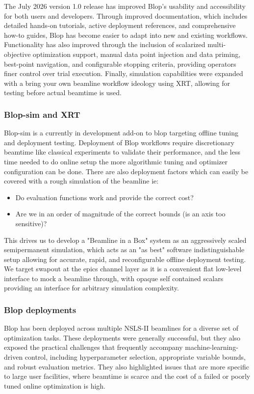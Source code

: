 The July 2026 version 1.0 release has improved Blop's usability and accessibility 
for both users and developers. Through improved documentation, which includes detailed 
hands-on tutorials, active deployment references, and comprehensive how-to guides, Blop 
has become easier to adapt into new and existing workflows.
Functionality has also improved through the inclusion of scalarized multi-objective optimization 
support, manual data point injection and data priming, best-point navigation, and configurable 
stopping criteria, providing operators finer control over trial execution. Finally, 
simulation capabilities were expanded with a bring your own beamline workflow ideology 
using XRT, allowing for testing before actual beamtime is used.

\subsubsection{Blop-sim and XRT}

Blop-sim is a currently in development add-on to blop targeting offline tuning and deployment
testing. Deployment of Blop workflows require discretionary beamtime like classical 
experiments to validate their performance, and the less time needed to do online setup the 
more algorithmic tuning and optimizer configuration can be done. There are also deployment
factors which can easily be covered with a rough simulation of the beamline ie:  

\begin{itemize} 

\item Do evaluation functions work and provide the correct cost?  

\item Are we in an order of magnitude of the correct bounds (is an axis too sensitive)?  

\end{itemize} 

This drives us to develop a "Beamline in a Box" system as an aggressively scaled semipermanent 
simulation, which acts as an "as best" software indistinguishable setup allowing for accurate, 
rapid, and reconfigurable offline deployment testing. We target swapout at the epics channel 
layer as it is a convenient flat low-level interface to mock a beamline through, with opaque 
self contained scalars providing an interface for arbitrary simulation complexity.

\subsubsection{Blop deployments}
Blop has been deployed across multiple NSLS-II beamlines for a diverse set of optimization tasks.
These deployments were generally successful, but they also exposed the practical challenges that
frequently accompany machine-learning-driven control, including hyperparameter selection,
appropriate variable bounds, and robust evaluation metrics. They also highlighted issues that are
more specific to large user facilities, where beamtime is scarce and the cost of a failed or poorly
tuned online optimization is high.

